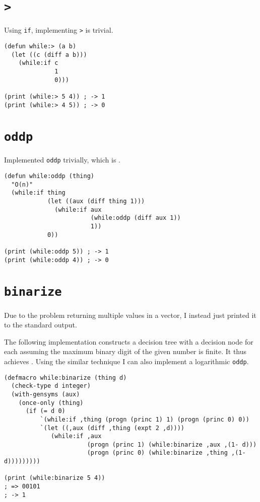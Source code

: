 \documentclass{article}
\begin{document}
\section{\texttt{>}}
\label{sec:org209c9e2}

Using \texttt{if}, implementing \texttt{>} is trivial.

\lstset{language=Lisp,label= ,caption= ,captionpos=b,numbers=none}
\begin{lstlisting}
(defun while:> (a b)
  (let ((c (diff a b)))
    (while:if c
              1
              0)))

(print (while:> 5 4)) ; -> 1
(print (while:> 4 5)) ; -> 0
\end{lstlisting}

\section{\texttt{oddp}}
\label{sec:org88529c7}

Implemented \texttt{oddp} trivially, which is .

\lstset{language=Lisp,label= ,caption= ,captionpos=b,numbers=none}
\begin{lstlisting}
(defun while:oddp (thing)
  "O(n)"
  (while:if thing
            (let ((aux (diff thing 1)))
              (while:if aux
                        (while:oddp (diff aux 1))
                        1))
            0))

(print (while:oddp 5)) ; -> 1
(print (while:oddp 4)) ; -> 0
\end{lstlisting}

\section{\texttt{binarize}}
\label{sec:orgbd31612}

Due to the problem returning multiple values in a vector, I instead just printed it to the standard output.

The following implementation constructs a decision tree with a decision node
for each assuming the maximum binary digit of the given number
is finite. It thus achieves . Using the similar technique I can also
implement a logarithmic \texttt{oddp}.

\lstset{language=Lisp,label= ,caption= ,captionpos=b,numbers=none}
\begin{lstlisting}
(defmacro while:binarize (thing d)
  (check-type d integer)
  (with-gensyms (aux)
    (once-only (thing)
      (if (= d 0)
          `(while:if ,thing (progn (princ 1) 1) (progn (princ 0) 0))
          `(let ((,aux (diff ,thing (expt 2 ,d))))
             (while:if ,aux
                       (progn (princ 1) (while:binarize ,aux ,(1- d)))
                       (progn (princ 0) (while:binarize ,thing ,(1- d)))))))))

(print (while:binarize 5 4))
; => 00101
; -> 1
\end{lstlisting}
\end{document}
